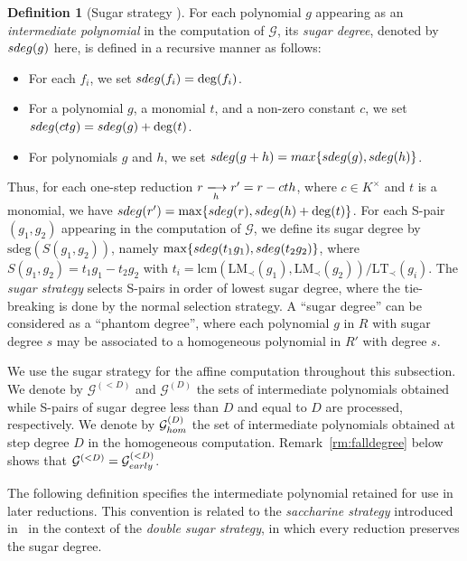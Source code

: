 \documentclass{article}
\theoremstyle{definition}
\newtheorem{definition}[theorem]{Definition}
\theoremstyle{plain}
\theoremstyle{plain}
\theoremstyle{plain}
\theoremstyle{plain}
\numberwithin{equation}{subsection}
\begin{document}
\begin{definition}[Sugar strategy \cite{sugar}]
For each polynomial $g$ appearing as an {\em intermediate polynomial} in the computation of $\mathcal{G}$, its {\em sugar degree}, denoted by ${\rm sdeg}(g)$ here, is defined in a recursive manner as follows:
\begin{itemize}
    \item[(1)] For each $f_i$, we set ${\rm sdeg}(f_i)=\deg(f_i)$.
    \item[(2)] For a polynomial $g$, a monomial $t$, and a non-zero constant $c$, we set ${\rm sdeg}(ctg)={\rm sdeg}(g)+\deg(t)$.
    \item[(3)] For polynomials $g$ and $h$, we set ${\rm sdeg}(g+h)={\rm max}\{{\rm sdeg}(g),{\rm sdeg}(h)\}$.
\end{itemize}
Thus, for each one-step reduction $r\xlongrightarrow[h]{} r'=r-cth$, where $c\in K^\times$ and $t$ is a monomial, we have ${\rm sdeg}(r')=\max\{{\rm sdeg}(r),{\rm sdeg}(h)+\deg(t)\}$. 
For each S-pair $(g_1,g_2)$ appearing in the computation of $\mathcal{G}$, we define its sugar degree by $\mathrm{sdeg}(S(g_1,g_2))$, namely $\max\{{\rm sdeg}(t_1g_1), {\rm sdeg}(t_2g_2)\}$, where $S(g_1,g_2)=t_1g_1-t_2g_2$ with $t_i=\mathrm{lcm}(\mathrm{LM}_{\prec}(g_1),\mathrm{LM}_{\prec}(g_2))/\mathrm{LT}_{\prec}(g_i)$. 
The {\em sugar strategy} selects S-pairs in order of lowest sugar degree, where the tie-breaking is done by the normal selection strategy. 
A ``sugar degree'' can be considered as a ``phantom degree'', where each polynomial $g$ in $R$ with sugar degree $s$ may be associated to a homogeneous polynomial in $R'$ with degree $s$.
\end{definition}

We use the sugar strategy for the affine computation throughout this subsection.
We denote by $\mathcal G^{(<D)}$ and $\mathcal G^{(D)}$ the sets of intermediate polynomials obtained while S-pairs of sugar degree less than $D$ and equal to $D$ are processed, respectively.
We denote by $\mathcal G_{\rm hom}^{(D)}$ the set of intermediate polynomials obtained at step degree $D$ in the homogeneous computation.
Remark~\ref{rm:falldegree} below shows that $\mathcal G^{(<D)}=\mathcal G_{\rm early}^{(<D)}$.

The following definition specifies the intermediate polynomial retained for use in later reductions.
This convention is related to the \emph{saccharine strategy} introduced in~\cite{sugar} in the context of the \emph{double sugar strategy}, in which every reduction preserves the sugar degree.
\end{document}
